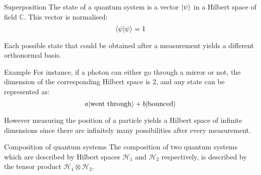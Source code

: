 \documentclass[a4paper]{article}
\begin{document}
\begin{parag}{Superposition}
    The state of a quantum system is a vector $\ket{\psi}$ in a Hilbert space of field $\mathbb{C}$. This vector is normalised: 
    \[\braket{\psi}{\psi} = 1\]

    Each possible state that could be obtained after a measurement yields a different orthonormal basis.

    \begin{subparag}{Example}
        For instance, if a photon can either go through a mirror or not, the dimension of the corresponding Hilbert space is 2, and any state can be represented as: 
        \[a\ket{\text{went through}} + b \ket{\text{bounced}}\]

        However measuring the position of a particle yields a Hilbert space of infinite dimensions since there are infinitely many possibilities after every measurement.
    \end{subparag}
\end{parag}

\begin{parag}{Composition of quantum systems}
    The composition of two quantum systems which are described by Hilbert spaces $\mathcal{H}_1$ and $\mathcal{H}_2$ respectively, is described by the tensor product $\mathcal{H}_1 \otimes \mathcal{H}_2$.
\end{parag}
\end{document}
